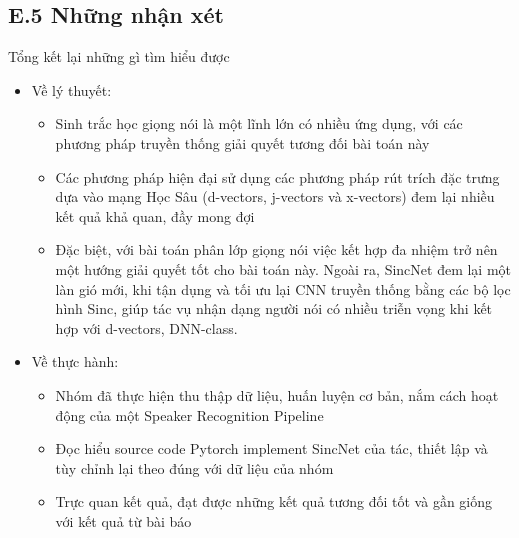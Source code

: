 \documentclass{article}
\begin{document}
	\subsection{E.5 Những nhận xét}
	Tổng kết lại những gì tìm hiểu được
	\begin{itemize}
		\item Về lý thuyết:
		\begin{itemize}
			\item Sinh trắc học giọng nói là một lĩnh lớn có nhiều ứng dụng, với các phương pháp truyền thống giải quyết tương đối bài toán này
			\item Các phương pháp hiện đại sử dụng các phương pháp rút trích đặc trưng dựa vào mạng Học Sâu (d-vectors, j-vectors và x-vectors) đem lại nhiều kết quả khả quan, đầy mong đợi
			\item Đặc biệt, với bài toán phân lớp giọng nói việc kết hợp đa nhiệm trở nên một hướng giải quyết tốt cho bài toán này. Ngoài ra, SincNet đem lại một làn gió mới, khi tận dụng và tối ưu lại CNN truyền thống bằng các bộ lọc hình Sinc, giúp tác vụ nhận dạng người nói có nhiều triễn vọng khi kết hợp với d-vectors, DNN-class.
		\end{itemize} 
		\item Về thực hành:
		\begin{itemize}
			\item Nhóm đã thực hiện thu thập dữ liệu, huấn luyện cơ bản, nắm cách hoạt động của một Speaker Recognition Pipeline
			\item Đọc hiểu source code Pytorch implement SincNet của tác, thiết lập và tùy chỉnh lại theo đúng với dữ liệu của nhóm
			\item Trực quan kết quả, đạt được những kết quả tương đối tốt và gần giống với kết quả từ bài báo
		\end{itemize}
	\end{itemize}
	\nocite{*}
	\newpage\cleardoublepage
	
	
\end{document}
